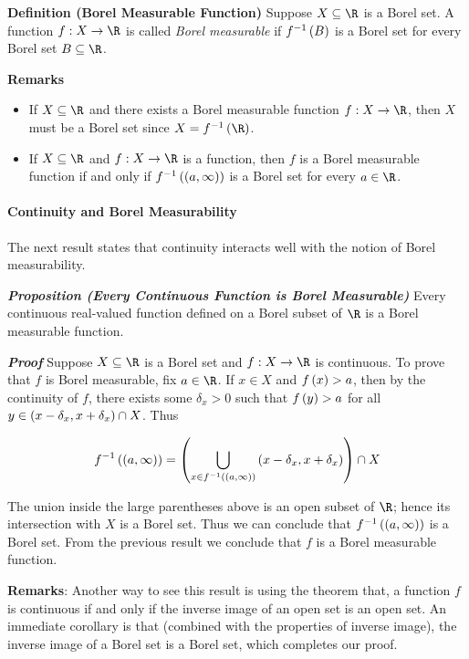 \documentclass[
]{article}
\begin{document}
\textbf{Definition (Borel Measurable Function)} Suppose \(X\se \R\) is a
Borel set. A function \(f:X\to \R\) is called \emph{Borel measurable} if
\({f}^{-1}\left(B\right)\) is a Borel set for every Borel set \(B\se \R\).

\textbf{Remarks}

\begin{itemize}
\item
  If \(X\se \R\) and there exists a Borel measurable function
  \(f:X\to \R\), then \(X\) must be a Borel set since
  \(X = \inv f\pr{\R}\).
\item
  If \(X\se \R\) and \(f:X\to \R\) is a function, then \(f\) is a Borel
  measurable function if and only if \({f}^{-1}\left(\left(a,\infty\right)\right)\) is a
  Borel set for every \(a\in \R\).
\end{itemize}

\hypertarget{continuity-and-borel-measurability}{%
\paragraph{Continuity and Borel
Measurability}\label{continuity-and-borel-measurability}}

The next result states that continuity interacts well with the notion of
Borel measurability.

\emph{\textbf{Proposition (Every Continuous Function is Borel
Measurable)}} Every continuous real-valued function defined on a Borel
subset of \(\R\) is a Borel measurable function.

\emph{\textbf{Proof}} Suppose \(X\se \R\) is a Borel set and
\(f:X\to \R\) is continuous. To prove that \(f\) is Borel measurable,
fix \(a\in \R\). If \(x\in X\) and \(f\left(x\right)>a\), then by the continuity
of \(f\), there exists some \(\delta_x>0\) such that \(f\left(y\right)>a\) for
all \(y\in \left(x-\delta_x,x+\delta_x\right)\cap X\). Thus

\[{f}^{-1} \left(\left(a,\infty\right)\right) = \left(\bigcup_{x\in {f}^{-1}\left(\left(a,\infty\right)\right)}\left(x-\delta_x,x+\delta_x\right)\right)\cap X\]

The union inside the large parentheses above is an open subset of
\(\R\); hence its intersection with \(X\) is a Borel set. Thus we can
conclude that \({f}^{-1}\left(\left(a,\infty\right)\right)\) is a Borel set. From the
previous result we conclude that \(f\) is a Borel measurable function.

\textbf{Remarks}: Another way to see this result is using the theorem
that, a function \(f\) is continuous if and only if the inverse image of
an open set is an open set. An immediate corollary is that (combined
with the properties of inverse image), the inverse image of a Borel set
is a Borel set, which completes our proof.
\end{document}
